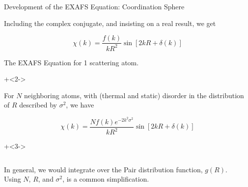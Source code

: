 \begin{slide}{Development of the EXAFS Equation: Coordination Sphere}

  Including the complex conjugate, and insisting on a real result, we get

   \[ \chi(k) = \frac{f(k)}{kR^2} {\sin[{2kR + \delta(k)}]} \]

    The EXAFS Equation for 1 scattering atom.

    \vmm
    \onslide+<2->

    For $N$ neighboring atoms, with (thermal and static) disorder in the
    distribution of $R$  described by  $\sigma^2$, we have

     \[ \chi(k) = \frac{N f(k) e^{-2k^2\sigma^2}}{kR^2} \sin{[2kR + \delta(k)]} \]

     \onslide+<3->

     \begin{columns}
       \begin{column}{45mm}
         In general, we would integrate over the {} Pair
         distribution function, $g(R)$.  Using $N$, $R$, and  $\sigma^2$,
         is a common simplification.

       \end{column}
       \begin{column}{55mm}
       \end{column}

     \end{columns}


 \vfill

 \end{slide}
